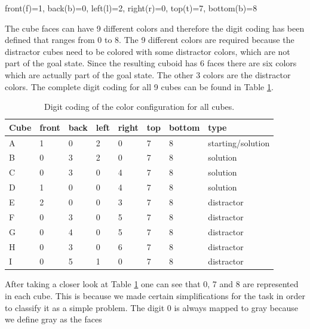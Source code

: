 \documentclass{article}
\begin{document}
front(f)=1, back(b)=0, left(l)=2, right(r)=0, top(t)=7, bottom(b)=8

The cube faces can have 9 different colors and therefore the digit coding has been defined that ranges from 0 to 8. The 9 different colors are required because the distractor cubes need to be colored with some distractor colors, which are not part of the goal state. Since the resulting cuboid has 6 faces there are six colors which are actually part of the goal state. The other 3 colors are the distractor colors. The complete digit coding for all 9 cubes can be found in Table \ref{tab:digit_coding}.

\begin{table}
\begin{center}
    \begin{tabular}{| l | | l | l | l | l | l | l |  l |}
    \hline
    Cube & front & back & left & right & top & bottom & type \\ \hline
    A & 1 & 0 & 2 & 0 & 7 & 8 & starting/solution \\ \hline
    B & 0 & 3 & 2 & 0 & 7 & 8 & solution \\ \hline
    C & 0 & 3 & 0 & 4 & 7 & 8 & solution \\ \hline
    D & 1 & 0 & 0 & 4 & 7 & 8 & solution \\ \hline
    E & 2 & 0 & 0 & 3 & 7 & 8 & distractor \\ \hline
    F & 0 & 3 & 0 & 5 & 7 & 8 & distractor \\ \hline
    G & 0 & 4 & 0 & 5 & 7 & 8 & distractor \\ \hline
    H & 0 & 3 & 0 & 6 & 7 & 8 & distractor \\ \hline
    I & 0 & 5 & 1 & 0 & 7 & 8 & distractor \\ \hline
    \end{tabular}
\end{center}
\caption{Digit coding of the color configuration for all cubes.}
\label{tab:digit_coding}
\end{table}

After taking a closer look at Table \ref{tab:digit_coding} one can see that 0, 7 and 8 are represented in each cube. This is because we made certain simplifications for the task in order to classify it as a simple problem. The digit 0 is always mapped to gray because we define gray as the faces 
\end{document}
